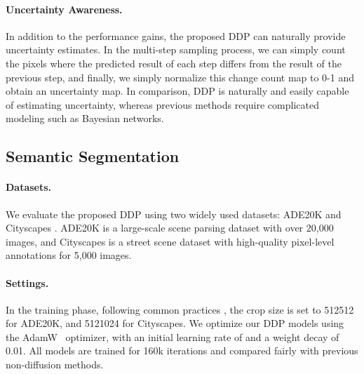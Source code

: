 \documentclass[10pt,twocolumn,letterpaper]{article}
\newcommand{\ours}[0]{DDP\xspace}
\begin{document}
\paragraph{Uncertainty Awareness.}
In addition to the performance gains, the proposed \ours can naturally provide uncertainty estimates.
In the multi-step sampling process, we can simply count the pixels where the predicted result of each step differs from the result of the previous step, and finally, we simply normalize this change count map to 0-1 and obtain an uncertainty map.
In comparison, DDP is naturally and easily capable of estimating uncertainty, whereas previous methods \cite{loquercio2020general,harakeh2020bayesod} require complicated modeling such as Bayesian networks.


\subsection{Semantic Segmentation}

\paragraph{Datasets.}
We evaluate the proposed \ours using two widely used datasets: ADE20K \cite{zhou2017scene} and Cityscapes \cite{Cordts_2016_CVPR}.
ADE20K is a large-scale scene parsing dataset with over 20,000 images, and Cityscapes is a street scene dataset with high-quality pixel-level annotations for 5,000 images.

\paragraph{Settings.}
\label{sec:semantic_settings}
In the training phase, following common practices \cite{wang2021pyramid,chen2022vitadapter,xie2021segformer,wang2022internimage}, the crop size is set to 512512 for ADE20K, and 5121024 for Cityscapes.
We optimize our \ours models using the AdamW~\cite{loshchilov2017decoupled} optimizer, with an initial learning rate of  and a weight decay of 0.01.
All models are trained for 160k iterations and compared fairly with previous non-diffusion methods.
\end{document}
